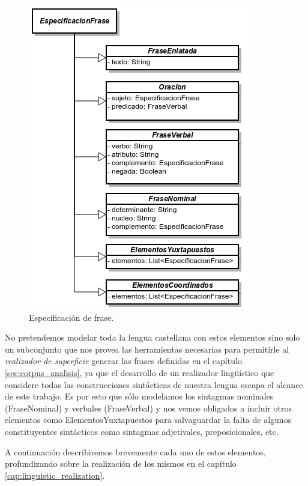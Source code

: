 \begin{figure}[h]
  	\centering
	\includegraphics[scale=0.7]{img/phrase_spec.png}
	\caption{Especificación de frase.}
  	\label{fig:phase_spec}
\end{figure}

No pretendemos modelar toda la lengua castellana con estos elementos sino solo un subconjunto que nos provea las herramientas necesarias para permitirle al \emph{realizador de superficie} generar las frases definidas en el capítulo \ref{sec:corpus_analisis}, ya que el desarrollo de un realizador lingüístico que considere todas las construcciones sintácticas de nuestra lengua escapa el alcance de este trabajo. Es por esto que sólo modelamos los sintagmas nominales (FraseNominal) y verbales (FraseVerbal) y nos vemos obligados a incluir otros elementos como ElementosYuxtapuestos para salvaguardar la falta de algunos constituyentes sintácticos como sintagmas adjetivales, preposicionales, etc. 

A continuación describiremos brevemente cada uno de estos elementos, profundizando sobre la realización de los mismos en el capítulo \ref{cap:linguistic_realization}.


